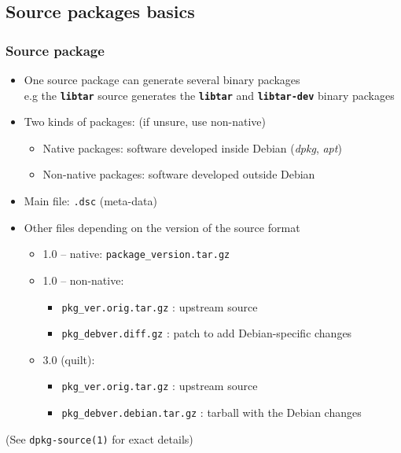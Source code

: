 \documentclass[10pt,final]{beamer}
\begin{document}
\subsection{Source packages basics}
\begin{frame}
\frametitle{Source package}
\begin{itemize}
	\item One source package can generate several binary packages\\
		{\small e.g the \texttt{\bfseries libtar} source generates the \texttt{\bfseries libtar} and \texttt{\bfseries libtar-dev} binary packages}
		\hbr
	\item Two kinds of packages: (if unsure, use non-native)
		\begin{itemize}
				\small
			\item Native packages: software developed inside Debian (\textsl{dpkg}, \textsl{apt})
			\item Non-native packages: software developed outside Debian
		\end{itemize}
		\hbr
	\item Main file: \texttt{.dsc} (meta-data)
		\hbr
	\item Other files depending on the version of the source format
	\begin{itemize}
		\item 1.0 -- native: \texttt{package\_version.tar.gz}
		\hbr
		\item 1.0 -- non-native:
		\begin{itemize}
			\item \texttt{pkg\_ver.orig.tar.gz} : upstream source
			\item \texttt{pkg\_debver.diff.gz} : patch to add Debian-specific changes
		\end{itemize}
		\hbr
		\item 3.0 (quilt):
		\begin{itemize}
			\item \texttt{pkg\_ver.orig.tar.gz} : upstream source
			\item \texttt{pkg\_debver.debian.tar.gz} : tarball with the Debian changes
		\end{itemize}
	\end{itemize}
\end{itemize}
\br
(See \texttt{dpkg-source(1)} for exact details)
\end{frame}
\end{document}
